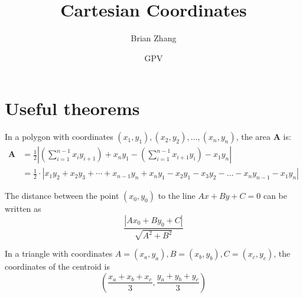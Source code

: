 \documentclass{article}
\title{Cartesian Coordinates}
\author{Brian Zhang}
\date{GPV}
\begin{document}
\maketitle
\section{Useful theorems}
\begin{theo}[Sholeace]
In a polygon with coordinates $(x_1,y_1),(x_2,y_2),\dots,(x_n,y_n)$, the area $\textbf{A}$ is: 
\begin{align*}
    \textbf{A} &= \frac{1}{2}\left|\left(\sum_{i=1}^{n-1}x_iy_{i+1}\right)+ x_ny_1-\left(\sum_{i=1}^{n-1}x_{i+1}y_i\right)-x_1y_n\right|\\ 
    &=\frac{1}{2}\cdot |x_1y_2+x_2y_3+\cdots + x_{n-1}y_n+x_ny_1-x_2y_1-x_3y_2-\dots-x_ny_{n-1}-x_1y_n|
\end{align*}
\end{theo}

\begin{theo}
The distance between the point $(x_0,y_0)$ to the line $Ax+By+C=0$ can be written as 
\[\frac{|Ax_0+By_0+C|}{\sqrt{A^2+B^2}}\]
\end{theo}

\begin{theo}
In a triangle with coordinates $A=(x_a,y_a),B=(x_b,y_b),C=(x_c,y_c)$, the coordinates of the centroid is
\[\left(\frac{x_a+x_b+x_c}{3},\frac{y_a+y_b+y_c}{3}\right)\]
\end{theo}
\end{document}
